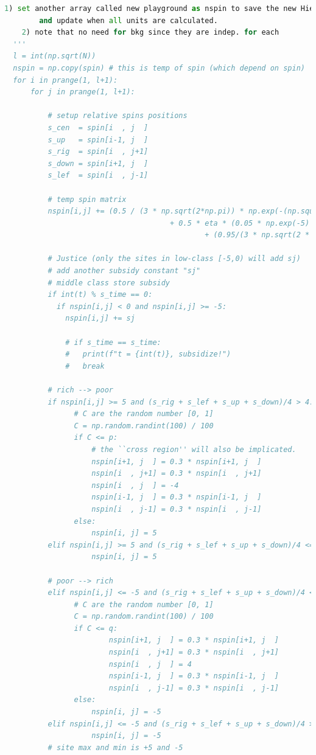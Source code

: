 \documentclass[10pt]{article}
\begin{document}
\begin{lstlisting}[language={Python}]
    1) set another array called new playground as nspin to save the new Hierarchy, 
        and update when all units are calculated.
    2) note that no need for bkg since they are indep. for each
  '''
  l = int(np.sqrt(N))
  nspin = np.copy(spin) # this is temp of spin (which depend on spin)
  for i in prange(1, l+1):
      for j in prange(1, l+1):

          # setup relative spins positions
          s_cen  = spin[i  , j  ]
          s_up   = spin[i-1, j  ]
          s_rig  = spin[i  , j+1]
          s_down = spin[i+1, j  ]
          s_lef  = spin[i  , j-1]

          # temp spin matrix
          nspin[i,j] += (0.5 / (3 * np.sqrt(2*np.pi)) * np.exp(-(np.square(s_cen)/(2 * np.square(3)))) * (-(4*s_cen - s_rig -s_lef - s_up - s_down))
                                      + 0.5 * eta * (0.05 * np.exp(-5) * np.exp(s_cen)
                                              + (0.95/(3 * np.sqrt(2 * np.pi))) * np.exp(-np.square(s_cen)/(2 * np.square(3)))) * bkg[i,j] * np.sin(2 * np.pi * t/tmax))

          # Justice (only the sites in low-class [-5,0) will add sj)
          # add another subsidy constant "sj"
          # middle class store subsidy
          if int(t) % s_time == 0:
            if nspin[i,j] < 0 and nspin[i,j] >= -5:
              nspin[i,j] += sj
              
              # if s_time == s_time:
              #   print(f"t = {int(t)}, subsidize!")
              #   break
              
          # rich --> poor
          if nspin[i,j] >= 5 and (s_rig + s_lef + s_up + s_down)/4 > 4:
                # C are the random number [0, 1]
                C = np.random.randint(100) / 100
                if C <= p:
                    # the ``cross region'' will also be implicated.
                    nspin[i+1, j  ] = 0.3 * nspin[i+1, j  ] 
                    nspin[i  , j+1] = 0.3 * nspin[i  , j+1]
                    nspin[i  , j  ] = -4
                    nspin[i-1, j  ] = 0.3 * nspin[i-1, j  ]
                    nspin[i  , j-1] = 0.3 * nspin[i  , j-1]
                else:
                    nspin[i, j] = 5
          elif nspin[i,j] >= 5 and (s_rig + s_lef + s_up + s_down)/4 <= 4:
                    nspin[i, j] = 5

          # poor --> rich
          elif nspin[i,j] <= -5 and (s_rig + s_lef + s_up + s_down)/4 < -4:
                # C are the random number [0, 1]
                C = np.random.randint(100) / 100
                if C <= q:
                        nspin[i+1, j  ] = 0.3 * nspin[i+1, j  ] 
                        nspin[i  , j+1] = 0.3 * nspin[i  , j+1]
                        nspin[i  , j  ] = 4
                        nspin[i-1, j  ] = 0.3 * nspin[i-1, j  ]
                        nspin[i  , j-1] = 0.3 * nspin[i  , j-1]
                else:
                    nspin[i, j] = -5    
          elif nspin[i,j] <= -5 and (s_rig + s_lef + s_up + s_down)/4 >= -4:
                    nspin[i, j] = -5
          # site max and min is +5 and -5


\end{lstlisting}
\end{document}

